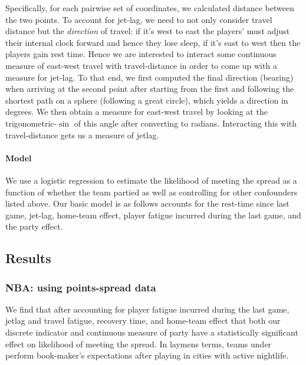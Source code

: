 \documentclass[letterpaper,12pt]{article}
\begin{document}
Specifically, for each pairwise set of coordinates, we calculated distance between the two
points.\citep{sp} To account for jet-lag, we need to not only consider travel distance
but the \emph{direction} of travel: if it's west to east the players' must adjust their internal
clock forward and hence they lose sleep, if it's east to west then the players gain rest time.
Hence we are interested to interact some continuous measure of east-west travel with
travel-distance in order to come up with a measure for jet-lag.
To that end, we first computed the final direction 
(bearing) when arriving at the 
second point after starting from the first and following the shortest path on a sphere 
(following a great circle), which yields a direction in degrees. 
We then obtain a measure for east-west travel by looking at the trigonometric-$\sin$ of this angle after converting to radians.
Interacting this with travel-distance gets us a measure of jetlag.\citep{lallensack}


\paragraph{Model} We use a logistic regression to estimate the likelihood of meeting
the spread as a function of whether the team partied as well as controlling for other confounders
listed above. Our basic model is as follows accounts for the rest-time since
last game, jet-lag, home-team effect, player fatigue incurred during the last game,
and the party effect.

\subsection{Results}
\subsubsection{NBA: using points-spread data}
We find that after accounting for player fatigue incurred during the last game, jetlag and travel fatigue, recovery time, and home-team effect that both our discrete indicator and continuous measure of party
have a statistically significant effect on likelihood of meeting the spread.
In laymens terms, teams under perform book-maker's expectations after playing in cities 
with active nightlife.
\end{document}
